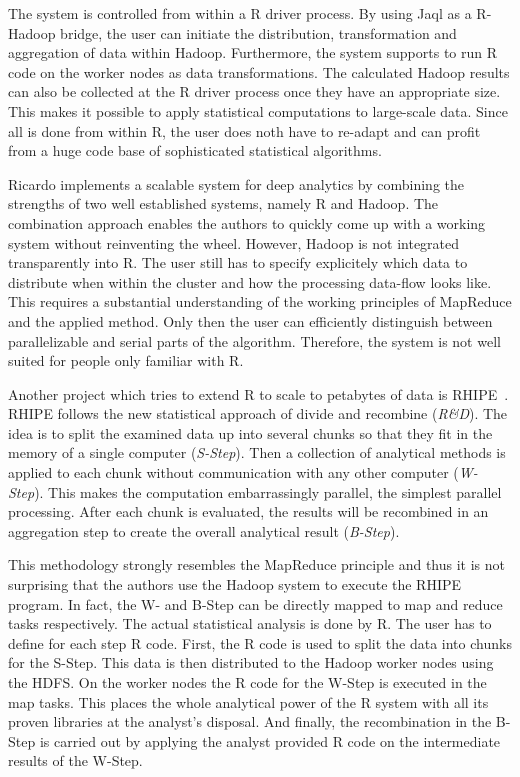 The system is controlled from within a R driver process.
By using Jaql as a R-Hadoop bridge, the user can initiate the distribution, transformation and aggregation of data within Hadoop.
Furthermore, the system supports to run R code on the worker nodes as data transformations.
The calculated Hadoop results can also be collected at the R driver process once they have an appropriate size.
This makes it possible to apply statistical computations to large-scale data.
Since all is done from within R, the user does noth have to re-adapt and can profit from a huge code base of sophisticated statistical algorithms.

Ricardo implements a scalable system for deep analytics by combining the strengths of two well established systems, namely R and Hadoop.
The combination approach enables the authors to quickly come up with a working system without reinventing the wheel.
However, Hadoop is not integrated transparently into R.
The user still has to specify explicitely which data to distribute when within the cluster and how the processing data-flow looks like.
This requires a substantial understanding of the working principles of MapReduce and the applied method.
Only then the user can efficiently distinguish between parallelizable and serial parts of the algorithm.
Therefore, the system is not well suited for people only familiar with R.

Another project which tries to extend R to scale to petabytes of data is RHIPE~\cite{guha:s2012a}.
RHIPE follows the new statistical approach of divide and recombine (\emph{R\&D}).
The idea is to split the examined data up into several chunks so that they fit in the memory of a single computer (\emph{S-Step}).
Then a collection of analytical methods is applied to each chunk without communication with any other computer (\emph{W-Step}).
This makes the computation embarrassingly parallel, the simplest parallel processing.
After each chunk is evaluated, the results will be recombined in an aggregation step to create the overall analytical result (\emph{B-Step}).

This methodology strongly resembles the MapReduce principle and thus it is not surprising that the authors use the Hadoop system to execute the RHIPE program.
In fact, the W- and B-Step can be directly mapped to map and reduce tasks respectively.
The actual statistical analysis is done by R.
The user has to define for each step R code.
First, the R code is used to split the data into chunks for the S-Step.
This data is then distributed to the Hadoop worker nodes using the HDFS.
On the worker nodes the R code for the W-Step is executed in the map tasks.
This places the whole analytical power of the R system with all its proven libraries at the analyst's disposal.
And finally, the recombination in the B-Step is carried out by applying the analyst provided R code on the intermediate results of the W-Step.

